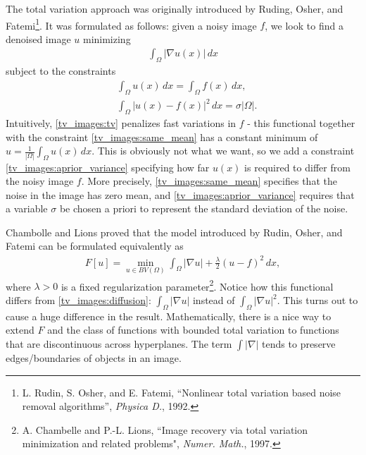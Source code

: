 The total variation approach was originally introduced by Ruding, Osher, and Fatemi\footnote{L. Rudin, S. Osher, and E. Fatemi, ``Nonlinear total variation based noise removal algorithms'', \emph{Physica D.}, 1992.}. It was formulated as follows: given a noisy image $f$, we look to find a denoised image $u$ minimizing
\begin{align}
\int_{\Omega} |\nabla u(x)|\, dx \label{tv_images:tv}
\end{align}
subject to the constraints
\begin{align}
    &{ } \int_{\Omega} u(x) \, dx = \int_{\Omega} f(x)\, dx, \label{tv_images:same_mean}\\
    &{ } \int_{\Omega} |u(x) - f(x)|^2\, dx = \sigma |\Omega|.\label{tv_images:aprior_variance}
\end{align}
Intuitively, \eqref{tv_images:tv} penalizes fast variations in $f$ - this functional together with the constraint \eqref{tv_images:same_mean} has a constant minimum of $u = \frac{1}{|\Omega|}\int_{\Omega} u(x) \, dx$. This is obviously not what we want, so we add a constraint \eqref{tv_images:aprior_variance} specifying how far $u(x)$ is required to differ from the noisy image $f$.  More precisely, \eqref{tv_images:same_mean} specifies that the noise in the image has zero mean, and \eqref{tv_images:aprior_variance} requires that a variable $\sigma$ be chosen a priori to represent the standard deviation of the noise.



Chambolle and Lions proved that the model introduced by Rudin, Osher, and Fatemi can be formulated equivalently as
\begin{align}
F[u] = \min_{u \in BV(\Omega)} \int_{\Omega} |\nabla u| + \frac{\lambda}{2}(u-f)^2 \, dx,
\end{align}
where $\lambda >0$ is a fixed regularization parameter\footnote{A. Chambelle and P.-L. Lions, ``Image recovery via total variation minimization and related problems", \emph{Numer. Math.}, 1997.}. Notice how this functional differs from \eqref{tv_images:diffusion}: $\int_{\Omega} |\nabla u|$ instead of $\int_{\Omega} |\nabla u|^2$. This turns out to cause a huge difference in the result.  Mathematically, there is a nice way to extend $F$ and the class of functions with bounded total variation to functions that are discontinuous across hyperplanes. The term $\int |\nabla|$ tends to preserve edges/boundaries of objects in an image.


